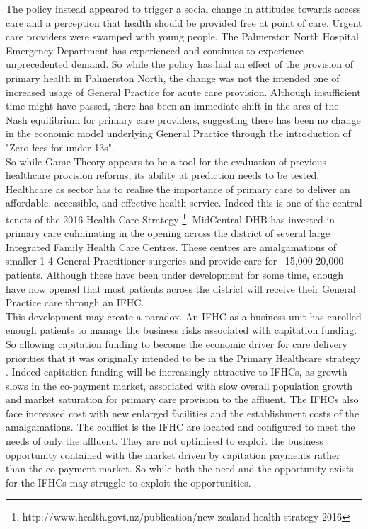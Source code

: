 \documentclass[11pt,a4paper]{article}
\begin{document}
The policy instead appeared to trigger a social change in attitudes towards access care and a perception that health should be provided free at point of care. Urgent care providers were swamped with young people. The Palmerston North Hospital Emergency Department has experienced and continues to experience unprecedented demand. So while the policy has had an effect of the provision of primary health in Palmerston North, the change was not the intended one of increased usage of General Practice for acute care provision. Although insufficient time might have passed, there has been an immediate shift in the arcs of the Nash equilibrium for primary care providers, suggesting there has been no change in the economic model underlying General Practice through the introduction of "Zero fees for under-13s".\\


So while Game Theory appears to be a tool for the evaluation of previous healthcare provision reforms, its ability at prediction needs to be tested. Healthcare as sector has to realise the importance of primary care to deliver an affordable, accessible, and effective health service. Indeed this is one of the central tenets of the 2016 Health Care Strategy \footnote{http://www.health.govt.nz/publication/new-zealand-health-strategy-2016}. MidCentral DHB has invested in primary care culminating in the opening across the district of several large Integrated Family Health Care Centres. These centres are amalgamations of smaller 1-4 General Practitioner surgeries and provide care for ~15,000-20,000 patients. Although these have been under development for some time, enough have now opened that most patients across the district will receive their General Practice care through an IFHC.\\


This development may create a paradox. An IFHC as a business unit has enrolled enough patients to manage the business risks associated with capitation funding. So allowing capitation funding to become the economic driver for care delivery priorities that it was originally intended to be in the Primary Healthcare strategy \citep{king2001primary}. Indeed capitation funding will be increasingly attractive to IFHCs, as growth slows in the co-payment market, associated with slow overall population growth and market saturation for primary care provision to the affluent. The IFHCs also face increased cost with new enlarged facilities and the establishment costs of the amalgamations. The conflict is the IFHC are located and configured to meet the needs of only the affluent. They are not optimised to exploit the business opportunity contained with the market driven by capitation payments rather than the co-payment market. So while both the need and the opportunity exists for the IFHCs may struggle to exploit the opportunities.\\
\end{document}
